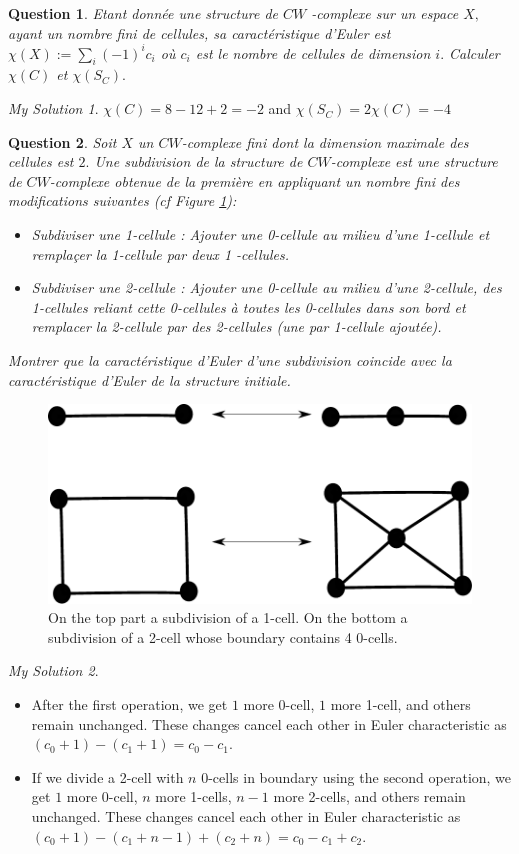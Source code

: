 \documentclass[]{article}
\newtheorem{prop}{Question}
\theoremstyle{remark}
\newtheorem*{sol}{My Solution}
\begin{document}
\begin{prop}
	Etant donnée une structure de $C W$ -complexe sur un espace $X,$ ayant un nombre fini de cellules, sa caractéristique d'Euler est $\chi(X):=\sum_{i}(-1)^{i} c_{i}$ où $c_{i}$ est le nombre de cellules de dimension $i .$ Calculer $\chi(C)$ et $\chi\left(S_{C}\right) .$
\end{prop}
\begin{sol}
	$ \chi(C) = 8 - 12 +2 =-2 $ and $ \chi(S_C) = 2\chi(C) =-4 $
\end{sol}
\begin{prop}
	Soit $X$ un $C W$-complexe fini dont la dimension maximale des cellules est $2 .$ Une subdivision de la structure de $C W$-complexe est une structure de $CW$-complexe obtenue de la première en appliquant un nombre fini des modifications suivantes (cf Figure \ref{fig:subdivision-of-a-1cell}):
	\begin{itemize}
		\item Subdiviser une 1-cellule : Ajouter une 0-cellule au milieu d'une 1-cellule et remplaçer la 1-cellule par deux 1 -cellules. 
		\item Subdiviser une 2-cellule : Ajouter une 0-cellule au milieu d'une 2-cellule, des 1-cellules reliant cette 0-cellules à toutes les 0-cellules dans son bord et remplacer la 2-cellule par des 2-cellules (une par 1-cellule ajoutée).
	\end{itemize}
	 Montrer que la caractéristique d'Euler d'une subdivision coincide avec la caractéristique d'Euler de la structure initiale.
\end{prop}
\begin{figure}
	\centering
	\includegraphics[width=0.7\linewidth]{"subdivision of a 1cell"}
	\caption{On the top part a subdivision of a 1-cell. On the bottom a subdivision of a 2-cell whose boundary contains 4 0-cells.}
	\label{fig:subdivision-of-a-1cell}
\end{figure}
\begin{sol}
	\begin{itemize}
		\item After the first operation, we get $ 1 $ more 0-cell, $ 1 $ more 1-cell, and others remain unchanged. These changes cancel each other in Euler characteristic as $ (c_0 +1) - (c_1 +1)=c_0 - c_1. $
		\item If we divide a 2-cell with $ n $ 0-cells in boundary using the second operation, we get $ 1 $ more 0-cell, $ n $ more 1-cells, $ n-1 $ more 2-cells, and others remain unchanged. These changes cancel each other in Euler characteristic as $ (c_0 +1) - (c_1 +n-1) + (c_2 +n)=c_0 - c_1 + c_2. $
	\end{itemize}
\end{sol}
\end{document}
